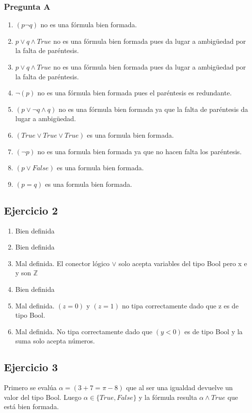 \subsubsection{Pregunta A}
\begin{enumerate}[label=(\alph*)]
    \item $(p \neg q)$ no es una fórmula bien formada.
    \item $p \vee q \wedge True$ no es una fórmula bien formada pues da lugar a ambigüedad por la falta de paréntesis.
    \item $p \vee q \wedge True$ no es una fórmula bien formada pues da lugar a ambigüedad por la falta de paréntesis.
    \item $\neg (p)$ no es una fórmula bien formada pues el paréntesis es redundante.
    \item $(p \vee \neg q \wedge q)$ no es una fórmula bien formada ya que la falta de paréntesis da lugar a ambigüedad.
    \item $(True \vee True \vee True)$ es una formula bien formada.
    \item $(\neg p)$ no es una formula bien formada ya que no hacen falta los paréntesis.
    \item $(p \vee False)$ es una formula bien formada.
    \item $(p = q)$ es una formula bien formada.
\end{enumerate}

\subsection{Ejercicio 2}
\begin{enumerate}[label=(\alph*)]
    \item Bien definida
    \item Bien definida
    \item Mal definida. El conector lógico $\vee$ solo acepta variables del tipo Bool pero x e y son $\mathbb{Z}$ 
    \item Bien definida
    \item Mal definida. $(z = 0)$ y $(z = 1)$ no tipa correctamente dado que z es de tipo Bool.
    \item Mal definida. No tipa correctamente dado que $(y < 0)$ es de tipo Bool y la suma solo acepta números.
\end{enumerate}

\subsection{Ejercicio 3}
Primero se evalúa $ \alpha = (3+7 = \pi - 8)$ que al ser una igualdad devuelve un valor del tipo Bool. Luego $\alpha \in \{True, False\}$
y la fórmula resulta $\alpha \wedge True$ que está bien formada.

